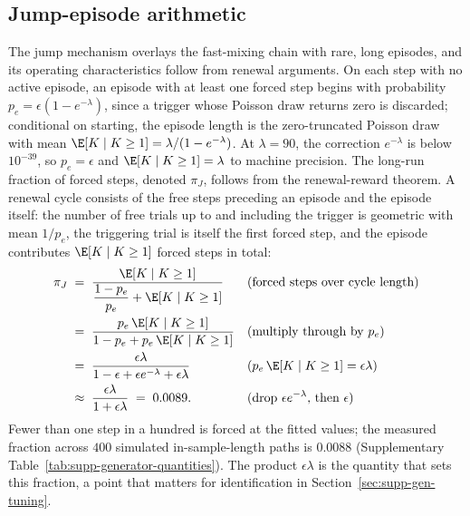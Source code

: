 \subsection{Jump-episode arithmetic}
\label{sec:supp-gen-renewal}

The jump mechanism overlays the fast-mixing chain with rare, long
episodes, and its operating characteristics follow from renewal
arguments. On each step with no active episode, an episode with at
least one forced step begins with probability
$p_e = \epsilon (1 - e^{-\lambda})$, since a trigger whose Poisson
draw returns zero is discarded; conditional on starting, the episode
length is the zero-truncated Poisson draw with mean
$\E[K \mid K \ge 1] = \lambda / (1 - e^{-\lambda})$. At $\lambda =
90$, the correction $e^{-\lambda}$ is below $10^{-39}$, so $p_e =
\epsilon$ and $\E[K \mid K \ge 1] = \lambda$ to machine precision.
The long-run fraction of forced steps, denoted $\pi_J$, follows from
the renewal-reward theorem. A renewal cycle consists of the free
steps preceding an episode and the episode itself: the number of free
trials up to and including the trigger is geometric with mean
$1/p_e$, the triggering trial is itself the first forced step, and
the episode contributes $\E[K \mid K \ge 1]$ forced steps in total:
\begin{align}
  \pi_J
   &\;=\; \frac{\E[K \mid K \ge 1]}
     {\dfrac{1 - p_e}{p_e} + \E[K \mid K \ge 1]}
     && \text{(forced steps over cycle length)} \notag \\
   &\;=\; \frac{p_e\, \E[K \mid K \ge 1]}
     {1 - p_e + p_e\, \E[K \mid K \ge 1]}
     && \text{(multiply through by $p_e$)} \notag \\
   &\;=\; \frac{\epsilon \lambda}
     {1 - \epsilon + \epsilon e^{-\lambda} + \epsilon \lambda}
     && \text{($p_e\, \E[K \mid K \ge 1] = \epsilon \lambda$)} \notag \\
   &\;\approx\; \frac{\epsilon \lambda}{1 + \epsilon \lambda}
     \;=\; 0.0089.
     && \text{(drop $\epsilon e^{-\lambda}$, then $\epsilon$)}
  \label{eq:supp-rho}
\end{align}
Fewer than one step in a hundred is forced at the fitted values; the
measured fraction across $400$ simulated in-sample-length paths is
$0.0088$ (Supplementary Table~\ref{tab:supp-generator-quantities}). The product $\epsilon \lambda$ is the quantity that sets
this fraction, a point that matters for identification in
Section~\ref{sec:supp-gen-tuning}.

